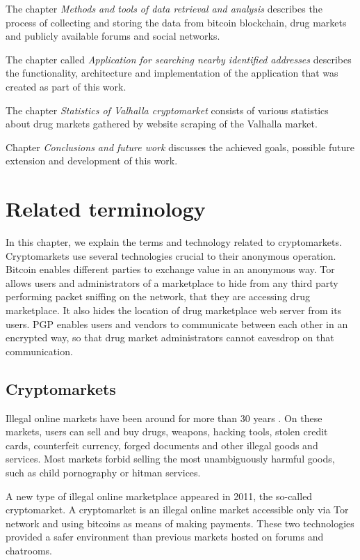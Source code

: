 \documentclass[
  digital, %
  table,   %
  lof,     %
  lot,     %
  oneside
]{fithesis3}
\begin{document}
The chapter \emph{Methods and tools of data retrieval and analysis} describes the process of collecting
and storing the data from bitcoin blockchain, drug markets and publicly available forums and social networks. 

The chapter called 
\emph{Application for searching nearby identified addresses}
describes the functionality, architecture and implementation of the application that was created as part of this work.

The chapter \emph{Statistics of Valhalla cryptomarket} consists of various statistics about
drug markets gathered by website scraping of the Valhalla market.

Chapter \emph{Conclusions and future work} discusses the achieved goals, possible future extension and development
of this work.


\chapter{Related terminology}

In this chapter, we explain the terms and technology related to cryptomarkets.
Cryptomarkets use several technologies crucial to their anonymous operation.
Bitcoin enables different parties to exchange value in an anonymous way.
Tor allows users and administrators of a marketplace to hide from any third party performing packet sniffing on the network,
that they are accessing drug marketplace. It also hides the location of drug marketplace web server from its users.
PGP enables users and vendors to communicate between each other in an encrypted way,
so that drug market administrators cannot eavesdrop on that communication.

\section{Cryptomarkets}

Illegal online markets have been around for more than 30 years \cite{motoyama2011analysis}.
On these markets, users can sell and buy drugs, weapons, hacking tools, stolen credit cards,
counterfeit currency, forged documents and other illegal goods and services.
Most markets forbid selling the most unambiguously harmful goods, such as child pornography or hitman services.

A new type of illegal online marketplace appeared in 2011, the so-called cryptomarket. 
A cryptomarket is an illegal online market accessible only via Tor network and using bitcoins
as means of making payments. These two technologies provided a safer environment
than previous markets hosted on forums and chatrooms.
\end{document}
